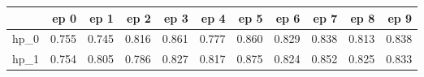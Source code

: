 \begin{tabular}{lrrrrrrrrrr}
\toprule
{} &   ep 0 &   ep 1 &   ep 2 &   ep 3 &   ep 4 &   ep 5 &   ep 6 &   ep 7 &   ep 8 &   ep 9 \\
\midrule
hp\_0 &  0.755 &  0.745 &  0.816 &  0.861 &  0.777 &  0.860 &  0.829 &  0.838 &  0.813 &  0.838 \\
hp\_1 &  0.754 &  0.805 &  0.786 &  0.827 &  0.817 &  0.875 &  0.824 &  0.852 &  0.825 &  0.833 \\
\bottomrule
\end{tabular}
